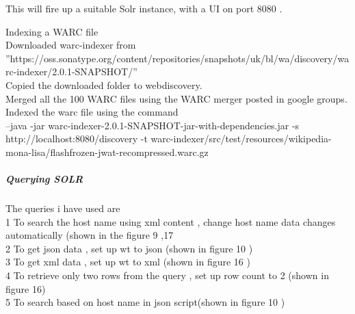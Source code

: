 \documentclass[12pt]{Report}
\begin{document}
This will fire up a suitable Solr instance, with a UI on port 8080 .

Indexing a WARC file \\

Downloaded warc-indexer from ''https://oss.sonatype.org/content/repositories/snapshots/uk/bl/wa/discovery/warc-indexer/2.0.1-SNAPSHOT/'' \\

Copied the downloaded folder to webdiscovery. \\

Merged all the 100 WARC files using the WARC merger posted in google groups. \\


Indexed the warc file using the command  \\

--java -jar warc-indexer-2.0.1-SNAPSHOT-jar-with-dependencies.jar  -s http://localhost:8080/discovery -t warc-indexer/src/test/resources/wikipedia-mona-lisa/flashfrozen-jwat-recompressed.warc.gz



\subparagraph{Querying SOLR}

The queries i have used are \\

1  To search the host name using xml content , change host name data changes automatically (shown in the figure 9  ,17\\

2 To get json data , set up wt to json (shown in figure 10  ) \\

3 To get xml data , set up wt to xml (shown in figure 16 ) \\

4 To retrieve only two rows from the query , set up  row count to 2 (shown in figure  16) \\

5 To search based on host name in json script(shown in figure 10 )\\
\end{document}
